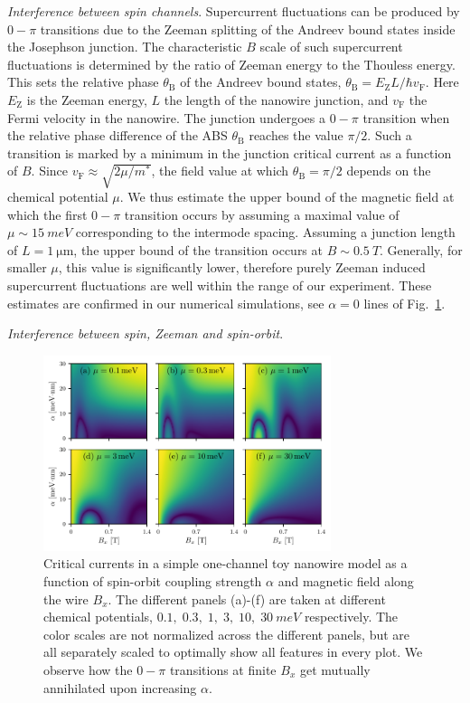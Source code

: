 \documentclass[english, aps,prb,showpacs,preprintnumber,amsmath,amssymb,superscriptaddress,reprint]{revtex4-1}
\begin{document}
\textit{Interference between spin channels}.
Supercurrent fluctuations can be produced by $0-\pi$ transitions due to the Zeeman splitting of the Andreev bound states inside the Josephson junction.
The characteristic $B$ scale of such supercurrent fluctuations is determined by the ratio of Zeeman energy to the Thouless energy.
This sets the relative phase $\theta_\mathrm{B}$ of the Andreev bound states, $\theta_\mathrm{B} = E_\mathrm{Z} L / \hbar v_\mathrm{F}$.
Here $E_\mathrm{Z}$ is the Zeeman energy, $L$ the length of the nanowire junction, and $v_\mathrm{F}$ the Fermi velocity in the nanowire.
The junction undergoes a $0-\pi$ transition when the relative phase difference of the ABS $\theta_\mathrm{B}$ reaches the value $\pi/2$. Such a transition is marked by a minimum in the junction critical current as a function of $B$.
Since $v_\mathrm{F}\approx \sqrt{2\mu / m^*}$, the field value at which $\theta_\mathrm{B}=\pi/2$ depends on the chemical potential $\mu$.
We thus estimate the upper bound of the magnetic field at which the first $0-\pi$ transition occurs by assuming a maximal value of $\mu \sim \SI{15}{meV}$ corresponding to the intermode spacing\cite{vanweperen2015spinorbit,kammhuber2016conductance}.
Assuming a junction length of $L=\SI{1}{\micro\meter}$, the upper bound of the transition occurs at $B\sim \SI{0.5}{T}$.
Generally, for smaller $\mu$, this value is significantly lower, therefore purely Zeeman induced supercurrent fluctuations are well within the range of our experiment.
These estimates are confirmed in our numerical simulations, see $\alpha=0$ lines of Fig.~\ref{fig:currents_1D_alpha_vs_B_x}.

\textit{Interference between spin, Zeeman and spin-orbit}.

\begin{figure}
\centering
\includegraphics[width=0.75\textwidth]{figures/sup_fig7}
\caption{Critical currents in a simple one-channel toy nanowire model\cite{lutchyn2010majorana,oreg2010helical} as a function of spin-orbit coupling strength $\alpha$ and magnetic field along the wire $B_x$.
The different panels (a)-(f) are taken at different chemical potentials, $0.1,\; 0.3,\; 1,\; 3,\; 10,\; \SI{30}{meV}$ respectively.
The color scales are not normalized across the different panels, but are all separately scaled to optimally show all features in every plot.
We observe how the $0-\pi$ transitions at finite $B_x$ get mutually annihilated upon increasing $\alpha$.\label{fig:currents_1D_alpha_vs_B_x}}
\end{figure}
\end{document}
